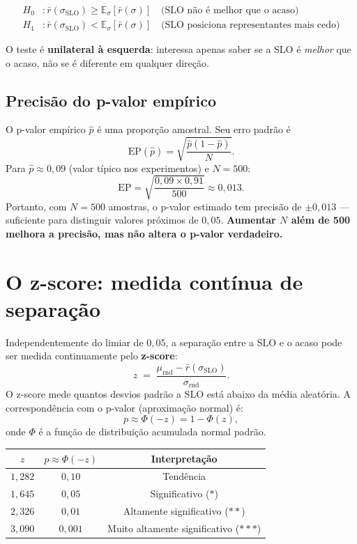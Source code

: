 \documentclass[a4paper,11pt]{article}
\begin{document}
\begin{align*}
  H_0 &: \bar{r}(\sigma_{\text{SLO}}) \geq \mathbb{E}_\sigma[\bar{r}(\sigma)]
       \quad\text{(SLO não é melhor que o acaso)}\\
  H_1 &: \bar{r}(\sigma_{\text{SLO}}) < \mathbb{E}_\sigma[\bar{r}(\sigma)]
       \quad\text{(SLO posiciona representantes mais cedo)}
\end{align*}

O teste é \textbf{unilateral à esquerda}: interessa apenas saber se a
SLO é \emph{melhor} que o acaso, não se é diferente em qualquer direção.

\subsection{Precisão do p-valor empírico}

O p-valor empírico $\hat{p}$ é uma proporção amostral. Seu erro padrão
é
\[
  \text{EP}(\hat{p}) = \sqrt{\frac{\hat{p}(1-\hat{p})}{N}}.
\]
Para $\hat{p} \approx 0{,}09$ (valor típico nos experimentos) e $N=500$:
\[
  \text{EP} = \sqrt{\frac{0{,}09 \times 0{,}91}{500}} \approx 0{,}013.
\]
Portanto, com $N=500$ amostras, o p-valor estimado tem precisão de
$\pm 0{,}013$ — suficiente para distinguir valores próximos de $0{,}05$.
\textbf{Aumentar $N$ além de 500 melhora a precisão, mas não altera o
p-valor verdadeiro.}

\section{O z-score: medida contínua de separação}

Independentemente do limiar de $0{,}05$, a separação entre a SLO e o
acaso pode ser medida continuamente pelo \textbf{z-score}:
\[
  z \;=\; \frac{\mu_{\text{rnd}} - \bar{r}(\sigma_{\text{SLO}})}{\sigma_{\text{rnd}}}.
\]
O z-score mede quantos desvios padrão a SLO está abaixo da média
aleatória. A correspondência com o p-valor (aproximação normal) é:
\[
  p \approx \Phi(-z) = 1 - \Phi(z),
\]
onde $\Phi$ é a função de distribuição acumulada normal padrão.

\begin{center}
\renewcommand{\arraystretch}{1.2}
\begin{tabular}{ccc}
\toprule
$z$ & $p \approx \Phi(-z)$ & Interpretação \\
\midrule
$1{,}282$ & $0{,}10$ & Tendência \\
$1{,}645$ & $0{,}05$ & Significativo ($*$) \\
$2{,}326$ & $0{,}01$ & Altamente significativo ($**$) \\
$3{,}090$ & $0{,}001$ & Muito altamente significativo ($***$) \\
\bottomrule
\end{tabular}
\end{center}
\end{document}
